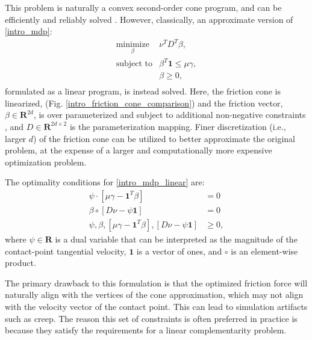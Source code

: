 This problem is naturally a convex second-order cone program, and can be efficiently and reliably solved \cite{lobo1998applications}. However, classically, an approximate version of \eqref{intro_mdp}:
\begin{equation}
	\begin{array}{ll}
		\underset{\beta}{\mbox{minimize}} & \nu^T D^T \beta, \\
		\mbox{subject to} & \beta^T \textbf{1} \leq \mu \gamma, \\
		& \beta \geq 0, \\
	\end{array} \label{intro_mdp_linear}
\end{equation}
formulated as a linear program, is instead solved. Here, the friction cone is linearized, (Fig. \ref{intro_friction_cone_comparison}) and the friction vector, $\beta \in \mathbf{R}^{2 d}$, is over parameterized and subject to additional non-negative constraints \cite{stewart1996implicit}, and $D \in \mathbf{R}^{2d \times 2}$ is the parameterization mapping. Finer discretization (i.e., larger $d$) of the friction cone can be utilized to better approximate the original problem, at the expense of a larger and computationally more expensive optimization problem.

The optimality conditions for \eqref{intro_mdp_linear} are:
\begin{align}
	\psi \cdot [\mu \gamma - \textbf{1}^T \beta] &= 0 \label{intro_friction_velocity_complementarity}\\
	\beta \circ [D \nu - \psi \textbf{1}] &= 0 \label{intro_friction_impulse_complementarity}\\
	\psi, \beta, [\mu \gamma - \textbf{1}^T \beta], [D \nu - \psi \textbf{1}] & \geq 0 \label{intro_friction_inequality}, 
\end{align}
where $\psi \in \mathbf{R}$ is a dual variable that can be interpreted as the magnitude of the contact-point tangential velocity, $\textbf{1}$ is a vector of ones, and $\circ$ is an element-wise product.

The primary drawback to this formulation is that the optimized friction force will naturally align with the vertices of the cone approximation, which may not align with the velocity vector of the contact point. This can lead to simulation artifacts such as creep. The reason this set of constraints is often preferred in practice is because they satisfy the requirements for a linear complementarity problem.

